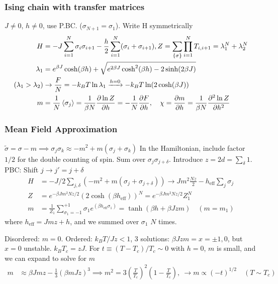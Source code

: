 \documentclass[a4paper, english, 12pt]{article}
\newcommand{\closed}[1]{\left( #1 \right)}
\newcommand{\curly}[1]{\{ #1 \} }
\begin{document}
\begin{multicols*}{2}
\subsubsection*{\scriptsize Ising chain with transfer matrices}
$J\neq0$, $h\neq0$, use P.BC. ($\sigma_{N+1}=\sigma_1$). Write H symmetrically 
\begin{align*}
    H &= -J\sum_{i=1}^N \sigma_i \sigma_{i+1} - \frac{h}{2}\sum_{i=1}^N (\sigma_i+\sigma_{i+1}), Z = \sum_{\curly{\sigma}} \prod_{i=1}^N T_{i,{i+1}}=\lambda_1^N+\lambda_2^N\\
    \lambda_1 &= e^{\beta J}\cosh(\beta h) + \sqrt{e^{2\beta J}\cosh^2(\beta h)-2\sinh(2\beta J) } \\ 
    (\lambda_1>\lambda_2)&\to \frac{F}{N} =-k_B T \ln\lambda_1 \xrightarrow{h=0} -k_B T \ln(2\cosh(\beta J)) \\
    m &= \frac{1}{N} \expval{\sigma_j} = \frac{1}{\beta N} \pdv{\ln Z}{h} = -\frac{1}{N}\pdv{F}{h},\quad \chi = \pdv{m}{h} = \frac{1}{\beta N} \pdv[2]{\ln Z}{h}
\end{align*}



\subsubsection*{Mean Field Approximation}

$\tilde{\sigma}=\sigma-m\implies \sigma_j \sigma_k \approx -m^2 + m(\sigma_j + \sigma_k)$
In the Hamiltonian, include factor $1/2$ for the double counting of spin. Sum over $\sigma_j \sigma_{j+\delta}$. Introduce $z=2d=\sum_\delta 1$. PBC: Shift $j\to j'=j+\delta$ 
\begin{align*}
    H &= -J/2 \sum_{j,\delta}  (-m^2 + m(\sigma_j + \sigma_{j+\delta})) \to Jm^2 \frac{Nz}{2} - h_\mathrm{eff} \sum_j \sigma_j \\ 
    Z &= e^{-\beta J m^2 Nz/2} \closed{2\cosh(\beta h_{\mathrm{eff}})}^N = e^{-\beta J m^2 Nz/2} Z_1^N \\
    m &= \frac{1}{Z_1} \sum_{\sigma_1=-1}^{+1} \sigma_1 e^{(\beta h_{\mathrm{eff}}\sigma_1)} = \tanh(\beta h + \beta Jzm)\quad(m=m_1)
\end{align*}  
where $h_\mathrm{eff}=Jmz+h$, and we summed over $\sigma_1$ $N$ times. 

Disordered: $m=0$. Ordered: $k_B T/Jz < 1$, $3$ solutions: $\beta Jzm = x=\pm1,0$, but $x=0$ unstable. $k_B T_c=zJ$. For $t\equiv(T-T_c)/T_c \sim 0$ with $h=0$, $m$ is small, and we can expand to solve for $m$
\begin{align*}
    m &\approx \beta J m z - \frac{1}{3} (\beta m J z)^3 \implies m^2 = 3 \closed{\frac{T}{T_c}}^2 \closed{1-\frac{T}{T_c}},\:\to m \propto (-t)^{1/2}\quad(T\sim T_c)
\end{align*}



\end{multicols*}
\end{document}
